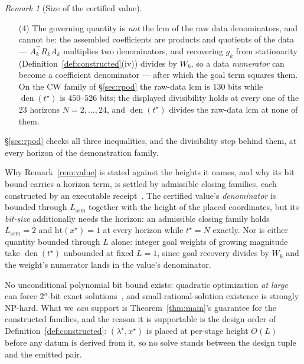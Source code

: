 \documentclass[11pt]{article}
\theoremstyle{definition}
\theoremstyle{remark}
\newtheorem{remark}{Remark}
\DeclareMathOperator{\den}{den}
\renewcommand{\_}{\ifdim\fontdimen3\font=0pt\relax\char`\_\else\textunderscore\fi\hspace{0pt}}
\begin{document}
\begin{remark}[Size of the certified value]
\begin{enumerate}
the log of the number of monomials one block row contributes --- at most
$3d^2{+}d{+}1$, since block-tridiagonality leaves block row $k$ at most $3d$
nonzero columns across its $d$ rows, plus $q_0$'s block of $d$ and the
constant --- giving
$\mathrm{bit}(t^\star)\le2(L_{\mathrm{asm}}+2L)+\lceil\log_2N\rceil
+\lceil\log_2(3d^2{+}d{+}1)\rceil=O(L_{\mathrm{asm}}+L+\log N)$, so whenever
$L_{\mathrm{asm}}$ is bounded in $N$, as it is on the demonstration family
of \S\ref{sec:rpod}, the value's size grows at most logarithmically along
the horizon.
\item[(4)] The governing quantity is \emph{not} the lcm of the raw data
denominators, and cannot be: the assembled coefficients are products and
quotients of the data --- $A_k^\top R_kA_k$ multiplies two denominators, and
recovering $g_k$ from stationarity (Definition~\ref{def:constructed}(iv))
divides by $W_k$, so a data \emph{numerator} can become a coefficient
denominator --- after which the goal term squares them. On the CW family of
\S\ref{sec:rpod} the raw-data lcm is $130$ bits while $\den(t^\star)$ is
$450$--$526$ bits; the displayed divisibility holds at every one of the $23$
horizons $N=2,\dots,24$, and $\den(t^\star)$ divides the raw-data lcm at
none of them.
\end{enumerate}
\S\ref{sec:rpod} checks all three inequalities, and the divisibility step
behind them, at every horizon of the demonstration family.
\end{remark}

\noindent Why Remark~\ref{rem:value} is stated against the heights it names,
and why its bit bound carries a horizon term, is settled by admissible
closing families, each constructed by an executable receipt~\cite{leannote}.
The certified value's \emph{denominator} is bounded through
$L_{\mathrm{asm}}$ together with the height of the placed coordinates, but
its \emph{bit-size} additionally needs the horizon: an admissible closing
family holds $L_{\mathrm{asm}}=2$ and $\mathrm{ht}(x^\star)=1$ at every
horizon while $t^\star=N$ exactly. Nor is either quantity bounded through
$L$ alone: integer goal weights of growing magnitude take $\den(t^\star)$
unbounded at fixed $L=1$, since goal recovery divides by $W_k$ and the
weight's numerator lands in the value's denominator.

No unconditional polynomial bit bound exists: quadratic optimization
\emph{at large} can force $2^n$-bit exact solutions~\cite{bienstock2020},
and small-rational-solution existence is strongly NP-hard. What we
\emph{can} support is Theorem~\ref{thm:main}'s guarantee for the constructed
families, and the reason it is supportable is the design order of
Definition~\ref{def:constructed}: $(\lambda^\star,x^\star)$ is placed at
per-stage height $O(L)$ before any datum is derived from it, so no solve
stands between the design tuple and the emitted pair.
\end{document}
